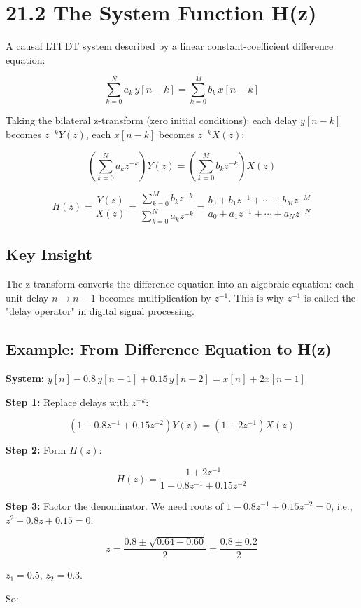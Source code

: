 \documentclass[11pt]{article}
\begin{document}
\section*{21.2 The System Function H(z)}

A causal LTI DT system described by a linear constant-coefficient difference equation:

\[\sum_{k=0}^{N} a_k\, y[n-k] = \sum_{k=0}^{M} b_k\, x[n-k]\]

Taking the bilateral z-transform (zero initial conditions): each delay $y[n-k]$ becomes $z^{-k} Y(z)$, each $x[n-k]$ becomes $z^{-k} X(z)$:

\[\left(\sum_{k=0}^{N} a_k z^{-k}\right) Y(z) = \left(\sum_{k=0}^{M} b_k z^{-k}\right) X(z)\]

\[H(z) = \frac{Y(z)}{X(z)} = \frac{\sum_{k=0}^{M} b_k z^{-k}}{\sum_{k=0}^{N} a_k z^{-k}} = \frac{b_0 + b_1 z^{-1} + \cdots + b_M z^{-M}}{a_0 + a_1 z^{-1} + \cdots + a_N z^{-N}}\]

\subsection*{Key Insight}

The z-transform converts the difference equation into an algebraic equation: each unit delay $n \to n-1$ becomes multiplication by $z^{-1}$. This is why $z^{-1}$ is called the "delay operator" in digital signal processing.

\subsection*{Example: From Difference Equation to H(z)}

\textbf{System:} $y[n] - 0.8\, y[n-1] + 0.15\, y[n-2] = x[n] + 2x[n-1]$

\textbf{Step 1:} Replace delays with $z^{-k}$:

\[(1 - 0.8 z^{-1} + 0.15 z^{-2}) Y(z) = (1 + 2 z^{-1}) X(z)\]

\textbf{Step 2:} Form $H(z)$:

\[H(z) = \frac{1 + 2 z^{-1}}{1 - 0.8 z^{-1} + 0.15 z^{-2}}\]

\textbf{Step 3:} Factor the denominator. We need roots of $1 - 0.8 z^{-1} + 0.15 z^{-2} = 0$, i.e., $z^2 - 0.8 z + 0.15 = 0$:

\[z = \frac{0.8 \pm \sqrt{0.64 - 0.60}}{2} = \frac{0.8 \pm 0.2}{2}\]

$z_1 = 0.5$, $z_2 = 0.3$.

So:
\end{document}
